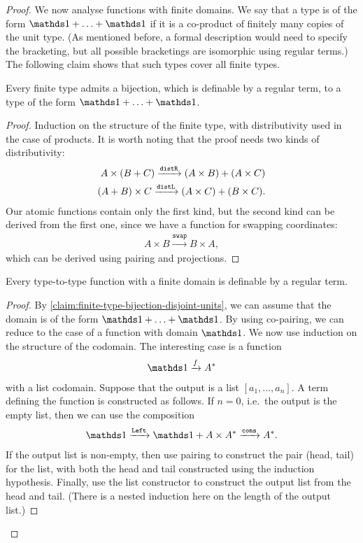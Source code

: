 \begin{proof}
    We now analyse functions with finite domains.
    We say that a type is of the form $\onetype + \ldots + \onetype$ if it is a co-product of finitely many copies of the unit type.  (As mentioned before, a formal description would need to specify the bracketing, but  all possible bracketings are isomorphic using regular terms.) The following claim shows that such types cover all finite types.
    \begin{claim}\label{claim:finite-type-bijection-disjoint-units}
        Every finite type admits a bijection, which is definable by a regular term, to a type of the form $\onetype + \ldots + \onetype$.
    \end{claim}
    \begin{proof}
        Induction on the structure of the finite type, with distributivity used in the case of products. It is worth noting that the proof needs two  kinds of distributivity:
\begin{align*}
A \times (B + C) \xrightarrow {\mathtt{distR}} (A \times B) + (A \times C)\\
(A + B) \times C \xrightarrow {\mathtt{distL}} (A \times C) + (B \times C).
\end{align*}
    Our atomic functions contain only the first kind, but the second kind can be derived from the first one, since we have a function for swapping coordinates:
\begin{align*}
A \times B \xrightarrow {\mathtt{swap}} B \times A,
\end{align*}
which can be derived using pairing and projections.
    \end{proof}
    \begin{claim}\label{claim:finite-domain-regular-list-function}
        Every type-to-type function with a finite domain  is definable by a regular term.
    \end{claim}
    \begin{proof}
        By \cref{claim:finite-type-bijection-disjoint-units}, we can assume that the domain is of the form $\onetype + \ldots + \onetype$. By using co-pairing, we can reduce to the case of a function with domain $\onetype$. We now use induction on the structure of the codomain. The interesting case is a function 
\begin{align*}
\onetype \xrightarrow f A^*
\end{align*}
with a list codomain. Suppose that the output is a list $[a_1,\ldots,a_n]$. A term defining the function is constructed as follows. If $n=0$, i.e.~the output is the empty list, then we can use the composition
\begin{align*}
\onetype \xrightarrow{\leftterm} \onetype + A \times A^* \xrightarrow {\consterm} A^*.
\end{align*}
If the output list is non-empty, then use pairing to construct the pair (head, tail) for the list, with both the head and tail constructed using the induction hypothesis. Finally, use the list constructor to construct the output list from the head and tail. (There is a nested induction here on the length of the output list.) 
\end{proof}


\end{proof}

